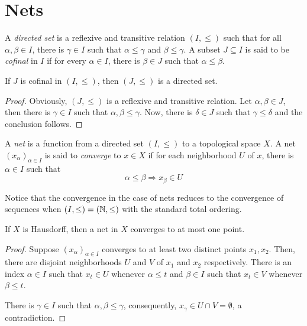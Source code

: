 \section{Nets}

\begin{definition}
    A \textit{directed set} is a reflexive and transitive relation $(I,\le)$ such that for all $\alpha,\beta\in I$, there is $\gamma\in I$ such that $\alpha\le\gamma$ and $\beta\le\gamma$.
    A subset $J\subseteq I$ is said to be \textit{cofinal} in $I$ if for every $\alpha\in I$, there is $\beta\in J$ such that $\alpha\le\beta$.
\end{definition}

\begin{proposition}
    If $J$ is cofinal in $(I,\le)$, then $(J,\le)$ is a directed set.
\end{proposition}
\begin{proof}
    Obviously, $(J,\le)$ is a reflexive and transitive relation. Let $\alpha,\beta\in J$, then there is $\gamma\in I$ such that $\alpha,\beta\le\gamma$. Now, there is $\delta\in J$ such that $\gamma\le\delta$ and the conclusion follows.
\end{proof}

\begin{definition}
    A \textit{net} is a function from a directed set $(I,\le)$ to a topological space $X$. A net $(x_\alpha)_{\alpha\in I}$ is said to \textit{converge} to $x\in X$ if for each neighborhood $U$ of $x$, there is $\alpha\in I$ such that 
    \begin{equation*}
        \alpha\le\beta\Longrightarrow x_\beta\in U
    \end{equation*}
\end{definition}

Notice that the convergence in the case of nets reduces to the convergence of sequences when $(I,\le) = (\mathbb{N},\le)$ with the standard total ordering.

\begin{lemma}
    If $X$ is Hausdorff, then a net in $X$ converges to at most one point.
\end{lemma}
\begin{proof}
    Suppose $(x_\alpha)_{\alpha\in I}$ converges to at least two distinct points $x_1,x_2$. Then, there are disjoint neighborhoods $U$ and $V$ of $x_1$ and $x_2$ respectively. There is an index $\alpha\in I$ such that $x_t\in U$ whenever $\alpha\le t$ and $\beta\in I$ such that $x_t\in V$ whenever $\beta\le t$.

    There is $\gamma\in I$ such that $\alpha,\beta\le\gamma$, consequently, $x_\gamma\in U\cap V = \emptyset$, a contradiction.
\end{proof}

